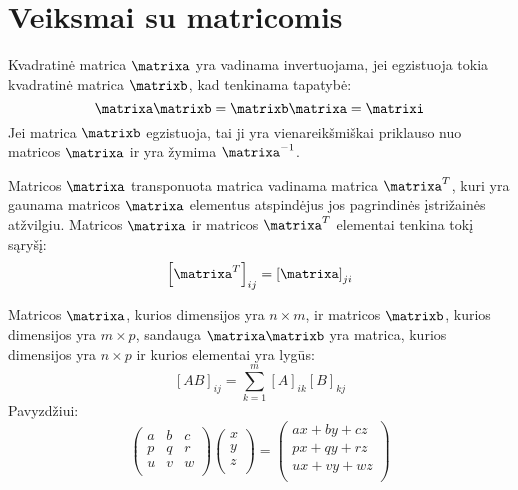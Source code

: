 
\section{Veiksmai su matricomis}

\begin{defn}
  Kvadratinė matrica $\matrixa$ yra vadinama invertuojama, jei egzistuoja
  tokia kvadratinė matrica $\matrixb$, kad tenkinama tapatybė:
  \begin{equation*}
    \matrixa \matrixb = \matrixb \matrixa = \matrixi
  \end{equation*}
  Jei matrica $\matrixb$ egzistuoja, tai ji yra vienareikšmiškai priklauso
  nuo matricos $\matrixa$ ir yra žymima $\matrixa^{-1}$.
\end{defn}

\begin{defn}
  Matricos $\matrixa$ transponuota matrica vadinama matrica $\matrixa^{T}$,
  kuri yra gaunama matricos $\matrixa$ elementus atspindėjus jos pagrindinės
  įstrižainės atžvilgiu. Matricos $\matrixa$ ir matricos
  $\matrixa^{T}$ elementai tenkina tokį sąryšį:
  \begin{equation*}
    \left[ \matrixa^{T} \right]_{ij} = \left[ \matrixa \right]_{ji}
  \end{equation*}
\end{defn}

\begin{defn}
  Matricos $\matrixa$, kurios dimensijos yra $n \times m$, ir matricos
  $\matrixb$, kurios dimensijos yra $m \times p$, sandauga
  $\matrixa\matrixb$ yra matrica, kurios dimensijos yra $n \times p$ ir
  kurios elementai yra lygūs:
  \begin{equation*}
    \left[ AB \right]_{ij}
      = \sum_{k=1}^{m} \left[ A \right]_{ik} \left[ B \right]_{kj}
  \end{equation*}
  Pavyzdžiui:
  \begin{equation*}
    \begin{pmatrix}
      a & b & c \\
      p & q & r \\
      u & v & w \\
    \end{pmatrix}
    \begin{pmatrix}
      x \\
      y \\
      z \\
    \end{pmatrix}
    =
    \begin{pmatrix}
      ax + by + cz \\
      px + qy + rz \\
      ux + vy + wz \\
    \end{pmatrix}
  \end{equation*}
\end{defn}
